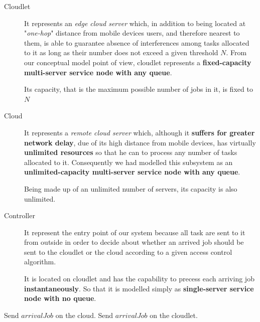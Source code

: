 \documentclass[10pt,a4paper]{article}
\begin{document}
\begin{description}
\item[Cloudlet] It represents an \textit{edge cloud server} which, in addition to being located at "\textit{one-hop}" distance from mobile devices users, and therefore nearest to them, is able to guarantee absence of interferences among tasks allocated to it as long as their number does not exceed a given threshold $N$. From our conceptual model point of view, cloudlet represents a \textbf{fixed-capacity multi-server service node with any queue}.

Its capacity, that is the maximum possible number of jobs in it, is fixed to $N$

\item[Cloud] It represents a \textit{remote cloud server} which, although it \textbf{suffers for greater network delay}, due of its high distance from mobile devices, has virtually \textbf{unlimited resources} so that he can to process any number of tasks allocated to it. Consequently we had modelled this subsystem as an \textbf{unlimited-capacity multi-server service node with any queue}.

Being made up of an unlimited number of servers, its capacity is also unlimited.

\item[Controller] It represent the entry point of our system because all task are sent to it from outside in order to decide about whether an arrived job should be sent to the cloudlet or the cloud according to a given access control algorithm.

It is located on cloudlet and has the capability to precess each arriving job \textbf{instantaneously}. So that it is modelled simply as \textbf{single-server service node with no queue}. 

\end{description}

\begin{algorithm}

\caption{}\label{alg:accessControlAlgorithm1}

\begin{algorithmic}[1]


	\State Send $\textit{arrivalJob}$ on the cloud.
\Else 	
 	\State Send $\textit{arrivalJob}$ on the cloudlet.
\EndIf

\EndFunction

\end{algorithmic}
\end{algorithm}
\end{document}
